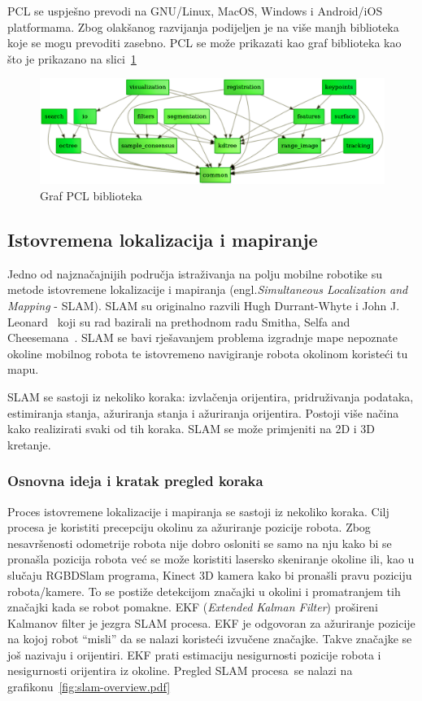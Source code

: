 PCL se uspješno prevodi na GNU/Linux, MacOS, Windows i Android/iOS
platformama. Zbog olakšanog razvijanja podijeljen je na više manjh
biblioteka koje se mogu prevoditi zasebno. PCL se može prikazati kao
graf biblioteka kao što je prikazano na slici~\ref{fig:pcl-graph.png}

\begin{figure}[h]
\centering
\includegraphics[scale=0.40]{figures/pcl-graph.png}
\caption{Graf PCL biblioteka}
\label{fig:pcl-graph.png}
\end{figure}



\newpage
\subsection{Istovremena lokalizacija i mapiranje} %
\label{sub:Slam}
Jedno od najznačajnijih područja istraživanja na polju mobilne robotike
su metode istovremene lokalizacije i mapiranja
(engl.\textit{Simultaneous Localization and Mapping} - SLAM). SLAM su
originalno razvili Hugh Durrant-Whyte i John J.
Leonard~\cite{Durrant:91b} koji su rad bazirali na prethodnom radu
Smitha, Selfa and Cheesemana~\cite{Smith86}. SLAM se bavi rješavanjem
problema izgradnje mape nepoznate okoline mobilnog robota te istovremeno
navigiranje robota okolinom koristeći tu mapu.

SLAM se sastoji iz nekoliko koraka: izvlačenja orijentira, pridruživanja
podataka, estimiranja stanja, ažuriranja stanja i ažuriranja orijentira.
Postoji više načina kako realizirati svaki od tih koraka. SLAM se može
primjeniti na 2D i 3D kretanje.

\subsubsection{Osnovna ideja i kratak pregled koraka} %
\label{ssub:Osnovna ideja }
Proces istovremene lokalizacije i mapiranja se sastoji iz nekoliko
koraka. Cilj procesa je koristiti precepciju okolinu za ažuriranje pozicije robota.
Zbog nesavršenosti odometrije robota nije dobro osloniti se samo na nju
kako bi se pronašla pozicija robota već se može koristiti lasersko
skeniranje okoline ili, kao u slučaju RGBDSlam programa, Kinect 3D kamera
kako bi pronašli pravu poziciju robota/kamere. To se postiže
detekcijom značajki u okolini i promatranjem tih značajki kada se
robot pomakne. EKF (\textit{Extended Kalman Filter}) prošireni Kalmanov
filter je jezgra SLAM procesa. EKF je odgovoran za ažuriranje pozicije
na kojoj robot ``misli'' da se nalazi koristeći izvučene značajke. Takve
značajke se još nazivaju i orijentiri. EKF prati estimaciju nesigurnosti
pozicije robota i nesigurnosti orijentira iz okoline. Pregled SLAM
procesa~\footnotemark[1] se nalazi na grafikonu~\ref{fig:slam-overview.pdf}  


